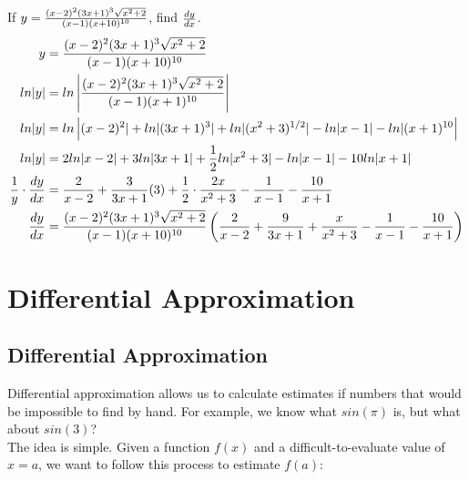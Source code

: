 \begin{exercise}\nonumber
    If $ y = {(x-2)^2(3x+1)^3\sqrt{x^2+2} \over (x-1)(x+10)^{10}} $, find $ dy \over dx $. \\

    \begin{align}
        y                               & = {(x-2)^2(3x+1)^3\sqrt{x^2+2} \over (x-1)(x+10)^{10}}                                                                                               \\
        ln|y|                           & = ln\left|{(x-2)^2 (3x+1)^3 \sqrt{x^2+2} \over (x-1) (x+1)^{10}}\right|                                                                              \\
        ln|y|                           & = ln\left|(x-2)^2| + ln|(3x+1)^3| + ln|(x^2+3)^{1/2}| - ln|x-1| - ln|(x+1)^{10}\right|                                                               \\
        ln|y|                           & = 2ln|x-2| + 3ln|3x+1| + {1 \over 2}ln|x^2+3| - ln|x-1| - 10ln|x+1|                                                                                  \\
        {1 \over y} \cdot {dy \over dx} & = {2 \over x-2} + {3 \over 3x+1}(3) + {1 \over 2} \cdot {2x \over x^2+3} - {1 \over x-1} - {10 \over x+1}                                            \\
        {dy \over dx}                   & = {(x-2)^2(3x+1)^3\sqrt{x^2+2} \over (x-1)(x+10)^{10}}\left({2 \over x-2} + {9 \over 3x+1} + {x \over x^2+3} - {1 \over x-1} - {10 \over x+1}\right)
    \end{align}
\end{exercise}

\chapter{Differential Approximation}

\section{Differential Approximation}

Differential approximation allows us to calculate estimates if numbers that would be impossible to find by hand. For example, we know what $ sin(\pi) $ is, but what about $ sin(3) $? \\

The idea is simple. Given a function $ f(x) $ and a difficult-to-evaluate value of $ x = a $, we want to follow this process to estimate $  f(a) $: \\


